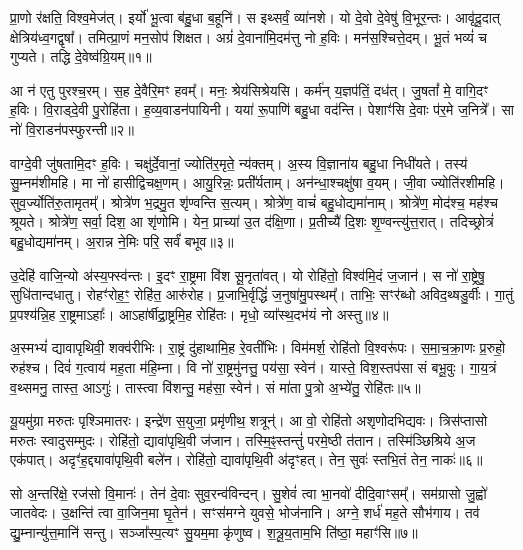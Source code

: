प्रा॒णो र॑क्षति॒ विश्व॒मेज॑त्।
इर्यो॑ भू॒त्वा ब॑हु॒धा ब॒हूनि॑।
स इथ्सर्वं॒ व्या॑नशे।
यो दे॒वो दे॒वेषु॑ वि॒भूर॒न्तः।
आवृ॑दू॒दात् क्षेत्रिय॑ध्व॒गद्वृषा᳚।
तमित्प्रा॒णं मन॒सोप॑ शिक्षत।
अग्रं॑ दे॒वाना॑मि॒दम॑त्तु नो ह॒विः।
मन॑स॒श्चित्ते॒दम्।
भू॒तं भव्यं॑ च गुप्यते।
तद्धि दे॒वेष्व॑ग्रि॒यम्॥१॥\ip

आ न॑ एतु पुरश्च॒रम्।
स॒ह दे॒वैरि॒मꣳ हवम्᳚।
मनः॒ श्रेय॑सिश्रेयसि।
कर्म॑न् य॒ज्ञप॑तिं॒ दध॑त्।
जु॒षतां᳚ मे॒ वागि॒दꣳ ह॒विः।
वि॒राड्दे॒वी पु॒रोहि॑ता।
ह॒व्य॒वाडन॑पायिनी।
यया॑ रू॒पाणि॑ बहु॒धा वद॑न्ति।
पेशाꣳ॑सि दे॒वाः प॑र॒मे ज॒नित्रे᳚।
सा नो॑ वि॒राडन॑पस्फुरन्ती॥२॥\ip

वाग्दे॒वी जु॑षतामि॒दꣳ ह॒विः।
चक्षु॑र्दे॒वानां॒ ज्योति॑र॒मृते॒ न्य॑क्तम्।
अ॒स्य वि॒ज्ञाना॑य बहु॒धा निधी॑यते।
तस्य॑ सु॒म्नम॑शीमहि।
मा नो॑ हासीद्विचक्ष॒णम्।
आयु॒रिन्नः॒ प्रती᳚र्यताम्।
अन॑न्धा॒श्चक्षु॑षा व॒यम्।
जी॒वा ज्योति॑रशीमहि।
सुव॒र्ज्योति॑रु॒तामृतम्᳚।
श्रोत्रे॑ण भ॒द्रमु॒त शृ॑ण्वन्ति स॒त्यम्।
श्रोत्रे॑ण॒ वाचं॑ बहु॒धोद्यमा॑नाम्।
श्रोत्रे॑ण॒ मोद॑श्च॒ मह॑श्च श्रूयते।
श्रोत्रे॑ण॒ सर्वा॒ दिश॒ आ शृ॑णोमि।
येन॒ प्राच्या॑ उ॒त द॑क्षि॒णा।
प्र॒तीच्यै॑ दि॒शः शृ॒ण्वन्त्यु॑त्त॒रात्।
तदिच्छ्रोत्रं॑ बहु॒धोद्यमा॑नम्।
अ॒रान्न ने॒मिः परि॒ सर्वं॑ बभूव॥३॥\ip\anuvakamend[अ॒ग्रि॒यमन॑पस्फुरन्ती स॒त्यꣳ स॒प्त च॑]

उ॒देहि॑ वाजि॒न्यो अ॑स्य॒फ्स्व॑न्तः।
इ॒दꣳ रा॒ष्ट्रमा वि॑श सू॒नृता॑वत्।
यो रोहि॑तो॒ विश्व॑मि॒दं ज॒जान॑।
स नो॑ रा॒ष्ट्रेषु॒ सुधि॑तान्दधातु।
रोहꣳ॑रोह॒ꣳ॒ रोहि॑त॒ आरु॑रोह।
प्र॒जाभि॒र्वृद्धिं॑ ज॒नुषा॑मु॒पस्थम्᳚।
ताभिः॒ सꣳर॑ब्धो अविद॒थ्षडु॒र्वीः।
गा॒तुं प्र॒पश्य॑न्नि॒ह रा॒ष्ट्रमा\-ऽहाः᳚।
आऽहा॑र्\mbox{}षीद्रा॒ष्ट्रमि॒ह रोहि॑तः।
मृधो॒ व्या᳚स्थ॒दभ॑यं नो अस्तु॥४॥\ip

अ॒स्मभ्यं॑ द्यावापृथिवी॒ शक्व॑रीभिः।
रा॒ष्ट्रं दु॑हाथामि॒ह रे॒वती॑भिः।
विम॑मर्\mbox{}श॒ रोहि॑तो वि॒श्वरू॑पः।
स॒मा॒च॒क्रा॒णः प्र॒रुहो॒ रुह॑श्च।
दिवं॑ ग॒त्वाय॑ मह॒ता म॑हि॒म्ना।
वि नो॑ रा॒ष्ट्रमु॑नत्तु॒ पय॑सा॒ स्वेन॑।
यास्ते॒ विश॒स्तप॑सा सं बभू॒वुः।
गा॒य॒त्रं व॒थ्समनु॒ तास्त॒ आऽगुः॑।
तास्त्वा वि॑शन्तु॒ मह॑सा॒ स्वेन॑।
सं मा॑ता पु॒त्रो अ॒भ्ये॑तु॒ रोहि॑तः॥५॥\ip

यू॒यमु॑ग्रा मरुतः पृश्ञिमातरः।
इन्द्रे॑ण स॒युजा॒ प्रमृ॑णीथ॒ शत्रून्॑।
आ वो॒ रोहि॑तो अशृणोदभिद्यवः।
त्रिस॑प्तासो मरुतः स्वादुसम्मुदः।
रोहि॑तो॒ द्यावा॑पृथि॒वी ज॑जान।
तस्मि॒ꣴ॒स्तन्तुं॑ परमे॒ष्ठी त॑तान।
तस्मि॑ञ्छिश्रिये अ॒ज एक॑पात्।
अदृꣳ॑ह॒द्द्यावा॑पृथि॒वी बले॑न।
रोहि॑तो॒ द्यावा॑पृथि॒वी अ॑दृꣳहत्।
तेन॒ सुवः॑ स्तभि॒तं तेन॒ नाकः॑॥६॥\ip

सो अ॒न्तरि॑क्षे॒ रज॑सो वि॒मानः॑।
तेन॑ दे॒वाः सुव॒रन्व॑विन्दन्।
सु॒शेवं॑ त्वा भा॒नवो॑ दीदि॒वाꣳसम्᳚।
सम॑ग्रासो जु॒ह्वो॑ जातवेदः।
उ॒क्षन्ति॑ त्वा वा॒जिन॒मा घृ॒तेन॑।
सꣳस॑मग्ने युवसे॒ भोज॑नानि।
अग्ने॒ शर्ध॑ मह॒ते सौभ॑गाय।
तव॑ द्यु॒म्नान्यु॑त्त॒मानि॑ सन्तु।
सञ्जा᳚स्प॒त्यꣳ सु॒यम॒मा कृ॑णुष्व।
श॒त्रू॒य॒ताम॒भि ति॑ष्ठा॒ महाꣳ॑सि॥७॥\ip\anuvakamend[अ॒स्त्वे॒तु॒ रोहि॑तो॒ नाको॒ महाꣳ॑सि]

